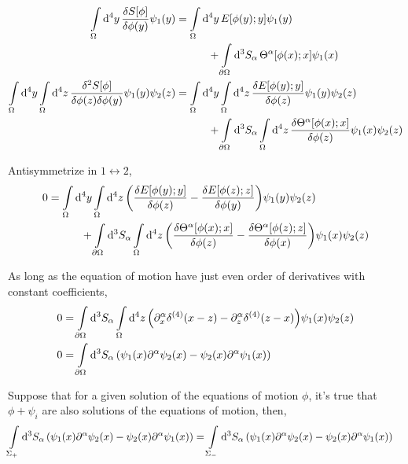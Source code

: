\begin{align}
    \int\limits_{\Omega}\dd[4]{y}\fdv{S[\phi]}{\phi\qty(y)}\psi_1\qty(y)&=\int\limits_{\Omega}\dd[4]{y}E\qty[\phi\qty(y);y]\psi_1(y)\nonumber\\
    &\quad\quad\quad+\int\limits_{\partial\Omega}\dd[3]{S_{\alpha}}\Theta^\alpha\qty[\phi(x);x]\psi_1(x)\\
    \int\limits_{\Omega}\dd[4]{y}\int\limits_{\Omega}\dd[4]{z}\frac{\delta^2 S[\phi]}{\delta\phi\qty(z)\delta\phi\qty(y)}\psi_1\qty(y)\psi_2\qty(z)&=\int\limits_{\Omega}\dd[4]{y}\int\limits_{\Omega}\dd[4]{z}\fdv{E\qty[\phi\qty(y);y]}{\phi(z)}\psi_1(y)\psi_2\qty(z)\nonumber\\
    &\quad\quad\quad+\int\limits_{\partial\Omega}\dd[3]{S_{\alpha}}\int\limits_{\Omega}\dd[4]{z}\fdv{\Theta^\alpha\qty[\phi(x);x]}{\phi\qty(z)}\psi_1(x)\psi_2\qty(z)\\
\end{align}

Antisymmetrize in $1\leftrightarrow2$,
\begin{align}
    0&=\int\limits_{\Omega}\dd[4]{y}\int\limits_{\Omega}\dd[4]{z}\qty(\fdv{E\qty[\phi\qty(y);y]}{\phi(z)}-\fdv{E\qty[\phi\qty(z);z]}{\phi(y)})\psi_1(y)\psi_2\qty(z)\nonumber\\
    &\quad\quad\quad+\int\limits_{\partial\Omega}\dd[3]{S_{\alpha}}\int\limits_{\Omega}\dd[4]{z}\qty(\fdv{\Theta^\alpha\qty[\phi(x);x]}{\phi\qty(z)}-\fdv{\Theta^\alpha\qty[\phi(z);z]}{\phi\qty(x)})\psi_1(x)\psi_2\qty(z)
\end{align}

As long as the equation of motion have just even order of derivatives with constant coefficients,
\begin{align}
    0&=\int\limits_{\partial\Omega}\dd[3]{S_{\alpha}}\int\limits_{\Omega}\dd[4]{z}\qty(\partial^\alpha_x\delta^{(4)}\qty(x-z)-\partial^\alpha_z\delta^{(4)}\qty(z-x))\psi_1(x)\psi_2\qty(z)\\
    0&=\int\limits_{\partial\Omega}\dd[3]{S_{\alpha}}\qty(\psi_1(x)\partial^\alpha\psi_2\qty(x)-\psi_2(x)\partial^\alpha\psi_1\qty(x))
\end{align}

Suppose that for a given solution of the equations of motion $\phi$, it's true that $\phi+\psi_i$ are also solutions of the 
equations of motion, then,
\begin{align}
    \int\limits_{\Sigma_+}\dd[3]{S_{\alpha}}\qty(\psi_1(x)\partial^\alpha\psi_2\qty(x)-\psi_2(x)\partial^\alpha\psi_1\qty(x))&=\int\limits_{\Sigma_-}\dd[3]{S_{\alpha}}\qty(\psi_1(x)\partial^\alpha\psi_2\qty(x)-\psi_2(x)\partial^\alpha\psi_1\qty(x))
\end{align}

